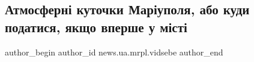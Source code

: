  
 
 
 
 
 
\subsection{Атмосферні куточки Маріуполя, або куди податися, якщо вперше у місті}
\label{sec:10_06_2019.stz.news.ua.mrpl.vidsebe.1.atmosferni_kutochky_mariupolja}
 
\ifcmt
 author_begin
   author_id news.ua.mrpl.vidsebe
 author_end
\fi
